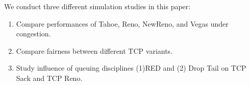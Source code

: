  We conduct three different simulation studies in this paper:
 \begin{enumerate}
 \item Compare performances of Tahoe, Reno, NewReno, and Vegas under congestion. 
 \item Compare fairness between different TCP variants.
 \item Study influence of queuing disciplines (1)RED and (2) Drop Tail on TCP Sack and TCP Reno.
 \end{enumerate}
 
 
